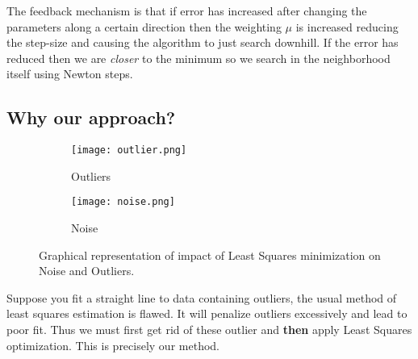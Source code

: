\documentclass[titlepage]{article}
\begin{document}
The feedback mechanism is that if error has increased after changing the parameters along a certain direction then the weighting $\mu$ is increased reducing the step-size and causing the algorithm to just search downhill. If the error has reduced then we are \textit{closer} to the minimum so we search in the neighborhood itself using Newton steps.
\subsection{Why our approach?}
\begin{figure}[H]
\begin{subfigure}{0.5\textwidth}
\texttt{[image: outlier.png]}
\caption{Outliers}
\label{Ransac_Flow}
\end{subfigure} 
\begin{subfigure}{0.5\textwidth}
\texttt{[image: noise.png]}
\caption{Noise}
\label{Optim_Flow}
\end{subfigure} 
\caption{Graphical representation of impact of Least Squares minimization on Noise and Outliers.}
\end{figure}
Suppose you fit a straight line to data containing outliers, the usual method of least squares estimation is flawed. It will penalize outliers excessively and lead to poor fit. Thus we must first get rid of these outlier and \textbf{then} apply Least Squares optimization. This is precisely our method.
\end{document}
